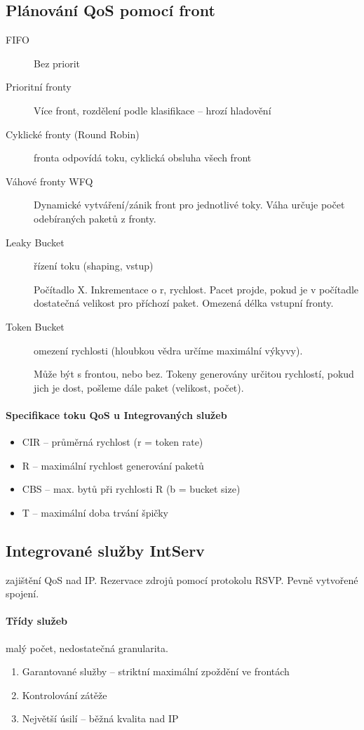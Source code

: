 \documentclass[a4paper, 11pt]{report}
\begin{document}
\subsection{Plánování QoS pomocí front}
\begin{description}
	\item[FIFO] Bez priorit
	\item[Prioritní fronty] Více front, rozdělení podle klasifikace -- hrozí hladovění
	\item[Cyklické fronty (Round Robin)] fronta odpovídá toku, cyklická obsluha všech front
	\item[Váhové fronty WFQ] Dynamické vytváření/zánik front pro jednotlivé toky. Váha určuje počet odebíraných paketů z fronty.
	\item[Leaky Bucket] řízení toku (shaping, vstup)
	
	Počítadlo X. Inkrementace o r, rychlost. Pacet projde, pokud je v počítadle dostatečná velikost pro příchozí paket. Omezená délka vstupní fronty.
	
	\item[Token Bucket] omezení rychlosti (hloubkou vědra určíme maximální výkyvy).
	
	Může být s frontou, nebo bez. Tokeny generovány určitou rychlostí, pokud jich je dost, pošleme dále paket (velikost, počet).
\end{description}

\paragraph{Specifikace toku QoS u Integrovaných služeb}
\begin{itemize}
	\item CIR -- průměrná rychlost (r = token rate)
	\item R -- maximální rychlost generování paketů
	\item CBS -- max. bytů při rychlosti R (b = bucket size)
	\item T -- maximální doba trvání špičky
\end{itemize}

\subsection{Integrované služby IntServ}
zajištění QoS nad IP. Rezervace zdrojů pomocí protokolu RSVP. Pevně vytvořené spojení.

\paragraph{Třídy služeb} malý počet, nedostatečná granularita. 
\begin{enumerate}
	\item Garantované služby -- striktní maximální zpoždění ve frontách
	\item Kontrolování zátěže
	\item Největší úsilí -- běžná kvalita nad IP
\end{enumerate}
\end{document}
